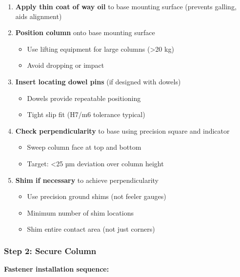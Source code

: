 \documentclass[
]{article}
\providecommand{\tightlist}{%
  \setlength{\itemsep}{0pt}\setlength{\parskip}{0pt}}
\begin{document}
\begin{enumerate}
\def\labelenumi{\arabic{enumi}.}
\tightlist
\item
  \textbf{Apply thin coat of way oil} to base mounting surface (prevents
  galling, aids alignment)
\item
  \textbf{Position column} onto base mounting surface

  \begin{itemize}
  \tightlist
  \item
    Use lifting equipment for large columns (\textgreater20 kg)
  \item
    Avoid dropping or impact
  \end{itemize}
\item
  \textbf{Insert locating dowel pins} (if designed with dowels)

  \begin{itemize}
  \tightlist
  \item
    Dowels provide repeatable positioning
  \item
    Tight slip fit (H7/m6 tolerance typical)
  \end{itemize}
\item
  \textbf{Check perpendicularity} to base using precision square and
  indicator

  \begin{itemize}
  \tightlist
  \item
    Sweep column face at top and bottom
  \item
    Target: \textless25 µm deviation over column height
  \end{itemize}
\item
  \textbf{Shim if necessary} to achieve perpendicularity

  \begin{itemize}
  \tightlist
  \item
    Use precision ground shims (not feeler gauges)
  \item
    Minimum number of shim locations
  \item
    Shim entire contact area (not just corners)
  \end{itemize}
\end{enumerate}

\subsubsection{Step 2: Secure Column}\label{step-2-secure-column}

\textbf{Fastener installation sequence:}
\end{document}
